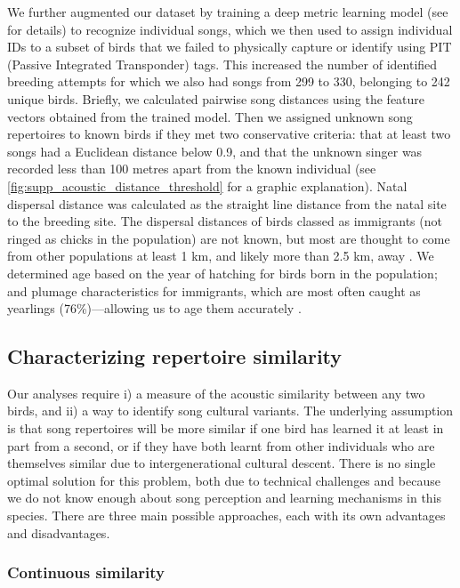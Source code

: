 We further augmented our dataset by training a deep metric learning model (see \parencite{merinorecalde2023a} for details) to recognize individual songs, which we then used to assign individual IDs to a subset of birds that we failed to physically capture or identify using PIT (Passive Integrated Transponder) tags. This increased the number of identified breeding attempts for which we also had songs from 299 to 330, belonging to 242 unique birds. Briefly, we calculated pairwise song distances using the feature vectors obtained from the trained model. Then we assigned unknown song repertoires to known birds if they met two conservative criteria: that at least two songs had a Euclidean distance below 0.9, and that the unknown singer was recorded less than 100 metres apart from the known individual (see \autoref{fig:supp_acoustic_distance_threshold} for a graphic explanation).
Natal dispersal distance was calculated as the straight line distance from the natal site to the breeding site. The dispersal distances of birds classed as immigrants (not ringed as  chicks in the population) are not known, but most are thought to come from other populations at least 1 km, and likely more than 2.5 km, away \parencite{verhulst1997, quinn2011}. We determined age based on the year of hatching for birds born in the population; and plumage characteristics for immigrants, which are most often caught as yearlings (76\%)---allowing us to age them accurately \parencite{woodman2023}.

\subsection{Characterizing repertoire similarity}

Our analyses require i) a measure of the acoustic similarity between any two birds, and ii) a way to identify song cultural variants.  The underlying assumption is that song repertoires will be more similar if one bird has learned it at least in part from a second, or if they have both learnt from other individuals who are themselves similar due to intergenerational cultural descent. There is no single optimal solution for this problem, both due to technical challenges and because we do not know enough about song perception and learning mechanisms in this species. There are three main possible approaches, each with its own advantages and disadvantages.

\subsubsection{Continuous similarity}


